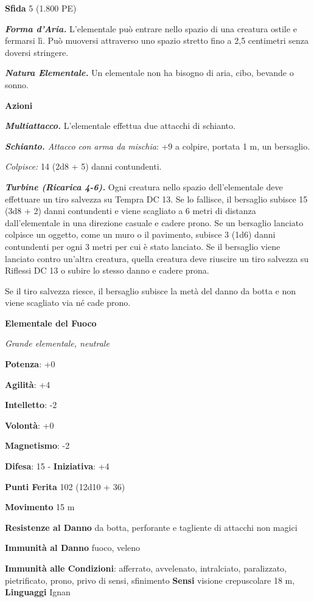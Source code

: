 \begin{multicols}{2}
\textbf{Sfida} 5 (1.800 PE)\smallskip

\emph{\textbf{Forma d'Aria.}} L'elementale può entrare nello spazio di
una creatura ostile e fermarsi lì. Può muoversi attraverso uno spazio
stretto fino a 2,5 centimetri senza doversi stringere.

\emph{\textbf{Natura Elementale.}} Un elementale non ha bisogno di aria,
cibo, bevande o sonno.

\smallskip\textbf{Azioni}

\emph{\textbf{Multiattacco.}} L'elementale effettua due attacchi di
schianto.

\emph{\textbf{Schianto.} Attacco con arma da mischia}: +9 a colpire,
portata 1 m, un bersaglio.

\emph{Colpisce:} 14 (2d8 + 5) danni contundenti.

\emph{\textbf{Turbine (Ricarica 4-6).}} Ogni creatura nello spazio
dell'elementale deve effettuare un tiro salvezza su Tempra DC 13. Se lo
fallisce, il bersaglio subisce 15 (3d8 + 2) danni contundenti e viene
scagliato a 6 metri di distanza dall'elementale in una direzione casuale
e cadere prono. Se un bersaglio lanciato colpisce un oggetto, come un
muro o il pavimento, subisce 3 (1d6) danni contundenti per ogni 3 metri
per cui è stato lanciato. Se il bersaglio viene lanciato contro un'altra
creatura, quella creatura deve riuscire un tiro salvezza su Riflessi DC
13 o subire lo stesso danno e cadere prona.

Se il tiro salvezza riesce, il bersaglio subisce la metà del danno
da botta e non viene scagliato via né cade prono.

\textbf{Elementale del Fuoco}

\emph{Grande elementale, neutrale}

\textbf{Potenza}: +0

\textbf{Agilità}: +4

\textbf{Intelletto}: -2

\textbf{Volontà}: +0

\textbf{Magnetismo}: -2

\textbf{Difesa}: 15 - \textbf{Iniziativa}: +4

\textbf{Punti Ferita} 102 (12d10 + 36)

\textbf{Movimento} 15 m

\textbf{Resistenze al Danno} da botta, perforante e tagliente di
attacchi non magici

\textbf{Immunità al Danno} fuoco, veleno

\textbf{Immunità alle Condizioni}: afferrato, avvelenato, intralciato,
paralizzato, pietrificato, prono, privo di sensi, sfinimento
\textbf{Sensi} visione crepuscolare 18 m, 
\textbf{Linguaggi} Ignan


\end{multicols}
